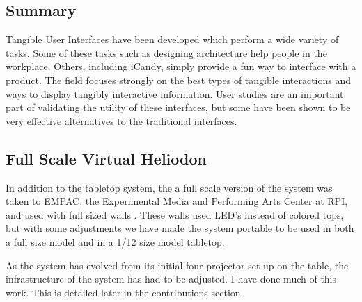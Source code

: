 \subsection{Summary}
Tangible User Interfaces have been developed which perform a wide variety of tasks.  Some of these tasks such as designing architecture help people in the workplace.  Others, including iCandy, simply provide a fun way to interface with a product.  The field focuses strongly on the best types of tangible interactions and ways to display tangibly interactive information. User studies are an important part of validating the utility of these interfaces, but some have been shown to be very effective alternatives to the traditional interfaces.

\subsection{Full Scale Virtual Heliodon}
In addition to the tabletop system, the a full scale version of the system was taken to EMPAC, the Experimental Media and Performing Arts Center at RPI, and used with full sized walls \cite{5543463}.  These walls used LED's instead of colored tops, but with some adjustments we have made the system portable to be used in both a full size model and in  a 1/12 size model tabletop.

As the system has evolved from its initial four projector set-up on the table, the infrastructure of the system has had to be adjusted.  I have done much of this work.  This is detailed later in the contributions section.

